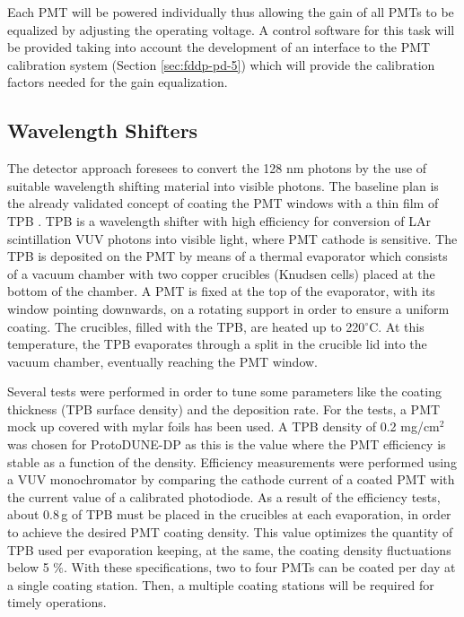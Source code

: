 Each PMT will be powered individually thus allowing the gain of all PMTs to be equalized by adjusting the operating voltage. A control software for this task will be provided taking into account the development of an interface to the PMT calibration system (Section \ref{sec:fddp-pd-5}) which will provide the calibration factors needed for the gain equalization.

\subsection{Wavelength Shifters}
\label{sec:fddp-pd-2.4}

The detector approach foresees to convert the 128 nm photons by the use of suitable wavelength shifting material into visible photons. The baseline plan is the already validated concept of coating the PMT windows with a thin film of TPB \cite{tpb}. TPB is a wavelength shifter with high efficiency for conversion of LAr scintillation VUV photons into visible light, where PMT cathode is sensitive. The TPB is deposited on the PMT by means of a thermal evaporator which consists of a vacuum chamber with two copper crucibles (Knudsen cells) placed at the bottom of the chamber. A PMT is fixed at the top of the evaporator, with its window pointing downwards, on a rotating support in order to ensure a uniform coating. The crucibles, filled with the TPB, are heated up to 220$^{\circ}$C. At this temperature, the TPB evaporates through a split in the crucible lid into the vacuum chamber, eventually reaching  the PMT window.

Several tests were performed in order to tune some parameters like the coating thickness (TPB surface density) and the deposition rate. For the tests, a PMT mock up covered with mylar foils has been used. A TPB density of 0.2 mg/cm$^2$ was chosen for ProtoDUNE-DP as this is the value where the PMT efficiency is stable as a function of the density. Efficiency measurements were performed using a VUV monochromator by comparing the cathode current of a coated PMT with the current value of a calibrated photodiode. As a result of the efficiency tests, about 0.8\,g of TPB must be placed in the crucibles at each evaporation, in order to achieve the desired PMT coating density. %
This value optimizes the quantity of TPB used per evaporation keeping, at the same, the coating density fluctuations below 5 $\%$. With these specifications, two to four PMTs can be coated per day at a single coating station. Then, a multiple coating stations will be required for timely operations.

